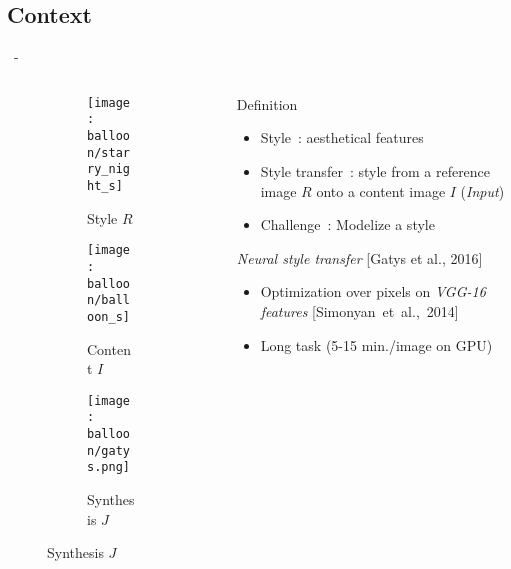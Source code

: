 \documentclass[aspectratio=169, 22pt]{beamer}
\begin{document}
\subsection{Context}
\begin{frame}{\secname~- \subsecname}
  \begin{columns}
    \begin{column}{0.4\linewidth}
      \begin{figure}
        \centering
        \begin{subfigure}{0.45\linewidth}\centering
          \texttt{[image: balloon/starry\_night\_s]}
          \caption{Style $R$}
        \end{subfigure}
        \begin{subfigure}{0.45\linewidth}\centering        
          \texttt{[image: balloon/balloon\_s]}
          \caption{Content $I$}
        \end{subfigure}

        \begin{subfigure}{0.8\linewidth}\centering
          \texttt{[image: balloon/gatys.png]}
          \caption{Synthesis $J$}
        \end{subfigure}
      \end{figure}
    \end{column}
    \begin{column}{0.6\linewidth}
      \begin{customblock}{Definition}
        \begin{itemize}
        \item \small Style : \alert{aesthetical features}
        \item \small Style transfer : style from a \alert{reference} image $R$ onto
          a \alert{content} image $I$ (\emph{Input})
        \item \small Challenge : Modelize a style
        \end{itemize}    
      \end{customblock}
      \begin{block}{\emph{Neural style transfer} [Gatys et al., 2016]}
        \begin{itemize}
        \item \small Optimization over pixels on
          \emph{VGG-16} \emph{features}  [Simonyan et al., 2014]
        \item \small \alert{Long} task (5-15 min./image on GPU)
        \end{itemize}
      \end{block}
    \end{column}
  \end{columns}
\end{frame}
\end{document}

